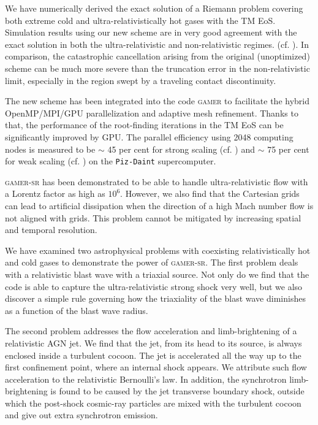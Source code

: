 \documentclass[twocolumn]{aastex63}
\begin{document}
 We have numerically derived the exact solution of a Riemann problem covering both extreme cold and ultra-relativistically hot gases with the TM EoS. Simulation results using our new scheme are in very good agreement with the exact solution in both the ultra-relativistic and non-relativistic regimes. (cf. ). In comparison, the catastrophic cancellation arising from the original (unoptimized) scheme can be much more severe than the truncation error in the non-relativistic limit, especially in the region swept by a traveling contact discontinuity.

The new scheme has been integrated into the code \textsc{gamer} to facilitate the hybrid OpenMP/MPI/GPU parallelization and adaptive mesh refinement. Thanks to that, the performance of the root-finding iterations in the TM EoS can be significantly improved by GPU. The parallel efficiency using 2048 computing nodes is measured to be $\sim$ 45 per cent for strong scaling (cf. ) and $\sim$ 75 per cent for weak scaling (cf. ) on the \texttt{Piz-Daint} supercomputer.

\textsc{gamer-sr} has been demonstrated to be able to handle ultra-relativistic flow with a Lorentz factor as high as $10^6$. However, we also find that the Cartesian grids can lead to artificial dissipation when the direction of a high Mach number flow is not aligned with grids. This problem cannot be mitigated by increasing spatial and temporal resolution.

 We have examined two astrophysical problems with coexisting relativistically hot and cold gases to demonstrate the power of \textsc{gamer-sr}. The first problem deals with a relativistic blast wave with a triaxial source. Not only do we find that the code is able to capture the ultra-relativistic strong shock very well, but we also discover a simple rule governing how the triaxiality of the blast wave diminishes as a function of the blast wave radius.

 The second problem addresses the flow acceleration and limb-brightening of a relativistic AGN jet. We find that the jet, from its head to its source, is always enclosed inside a turbulent cocoon. The jet is accelerated all the way up to the first confinement point, where an internal shock appears. We attribute such flow acceleration to the relativistic Bernoulli's law. In addition, the synchrotron limb-brightening is found to be caused by the jet transverse boundary shock, outside which the post-shock cosmic-ray particles are mixed with the turbulent cocoon and give out extra synchrotron emission.
\end{document}

